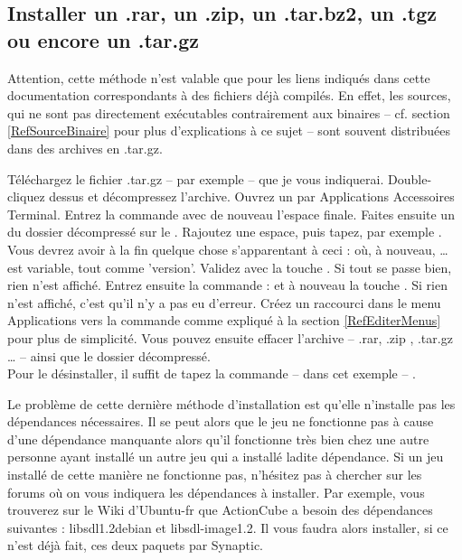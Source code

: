\subsection{Installer un .rar, un .zip, un .tar.bz2, un .tgz ou encore un .tar.gz}
\begin{nota}
Attention, cette méthode n'est valable que pour les liens indiqués dans cette documentation correspondants à des fichiers déjà compilés. En effet, les sources, qui ne sont pas directement exécutables contrairement aux binaires -- cf. section \ref{RefSourceBinaire} pour plus d'explications à ce sujet -- sont souvent distribuées dans des archives en .tar.gz.
\end{nota}
Téléchargez le fichier .tar.gz -- par exemple -- que je vous indiquerai. Double-cliquez dessus et décompressez l'archive. Ouvrez un  par Applications \FlecheDroite Accessoires \FlecheDroite Terminal. Entrez la commande  avec de nouveau l'espace finale. Faites ensuite un  du dossier décompressé sur le . Rajoutez une espace, puis tapez, par exemple . Vous devrez avoir à la fin quelque chose s'apparentant à ceci :  où, à nouveau, \ldots{} est variable, tout comme 'version'. Validez avec la touche . Si tout se passe bien, rien n'est affiché. Entrez ensuite la commande :  et à nouveau la touche . Si rien n'est affiché, c'est qu'il n'y a pas eu d'erreur. Créez un raccourci dans le menu Applications vers la commande  comme expliqué à la section \ref{RefEditerMenus} pour plus de simplicité. Vous pouvez ensuite effacer l'archive -- .rar, .zip , .tar.gz \ldots{} -- ainsi que le dossier décompressé.\\
Pour le désinstaller, il suffit de tapez la commande -- dans cet exemple -- .
\begin{nota}
Le problème de cette dernière méthode d'installation est qu'elle n'installe pas les dépendances nécessaires. Il se peut alors que le jeu ne fonctionne pas à cause d'une dépendance manquante alors qu'il fonctionne très bien chez une autre personne ayant installé un autre jeu qui a installé ladite dépendance. Si un jeu installé de cette manière ne fonctionne pas, n'hésitez pas à chercher sur les forums où on vous indiquera les dépendances à installer. Par exemple, vous trouverez sur le Wiki d'Ubuntu-fr que ActionCube a besoin des dépendances suivantes : libsdl1.2debian et libsdl-image1.2. Il vous faudra alors installer, si ce n'est déjà fait, ces deux paquets par Synaptic.
\end{nota}
